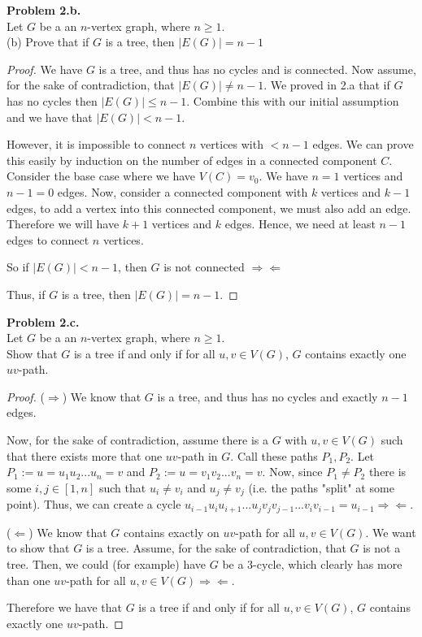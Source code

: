 \documentclass{article}
\newcommand{\contradiction}{\Rightarrow\!\Leftarrow}
\newenvironment{hwproof}[2]
{
    \textbf{Problem #1.}\\
    #2
    \begin{proof}
}{
    \end{proof}
}
\begin{document}
\begin{hwproof}{2.b}{
        Let $G$ be a an $n$-vertex graph, where $n \geq 1$.\\
        (b) Prove that if $G$ is a tree, then $|E(G)| = n - 1$
    }
    We have $G$ is a tree, and thus has no cycles and is connected. Now assume, for the sake
    of contradiction, that $|E(G)| \neq n - 1$. We proved in 2.a that if $G$ has no cycles then
    $|E(G)| \leq n - 1$. Combine this with our initial assumption and we have that
    $|E(G)| < n - 1$.

    However, it is impossible to connect $n$ vertices with $< n - 1$ edges.
    We can prove this easily by induction on the number of edges in a connected component $C$.
    Consider the base case where we have $V(C) = {v_0}$. We have $n = 1$ vertices and $n - 1 = 0$
    edges.
    Now, consider a connected component with $k$
    vertices and $k - 1$ edges, to add a vertex into this connected component, we must also add an edge.
    Therefore we will have $k + 1$ vertices and $k$ edges. Hence, we need at least $n - 1$
    edges to connect $n$ vertices.

    So if $|E(G)| < n - 1$, then $G$ is not connected $\contradiction$

    Thus, if $G$ is a tree, then $|E(G)| = n -1$.
\end{hwproof}

\begin{hwproof}{2.c}{
        Let $G$ be a an $n$-vertex graph, where $n \geq 1$.\\
        Show that $G$ is a tree if and only if for all $u,v \in V(G)$, $G$ contains
        exactly one $uv$-path.
    }
    ($\Rightarrow$)
    We know that $G$ is a tree, and thus has no cycles and exactly $n - 1$ edges.

    Now, for the sake of contradiction, assume there is a $G$ with $u,v \in V(G)$ such that
    there exists more that one $uv$-path in $G$. Call these paths $P_1, P_2$.
    Let $P_1 := u = u_1u_2...u_n=v$ and $P_2 := u = v_1v_2...v_n = v$. Now, since
    $P_1 \neq P_2$ there is some $i, j \in [1,n]$ such that $u_i \neq v_i$ and
    $u_j \neq v_j$ (i.e. the paths "split" at some point). Thus, we can
    create a cycle $u_{i-1}u_iu_{i+1}...u_jv_jv_{j-1}...v_iv_{i-1} = u_{i - 1}\contradiction$.

    ($\Leftarrow$)
    We know that $G$ contains exactly on $uv$-path for all $u,v \in V(G)$. We want to show
    that $G$ is a tree. Assume, for the sake of contradiction, that $G$ is not a tree.
    Then, we could (for example) have $G$ be a 3-cycle, which clearly has more than
    one $uv$-path for all $u,v \in V(G) \contradiction$.

    Therefore we have that $G$ is a tree if and only if for all $u,v \in V(G)$, $G$ contains
    exactly one $uv$-path.
\end{hwproof}
\end{document}
